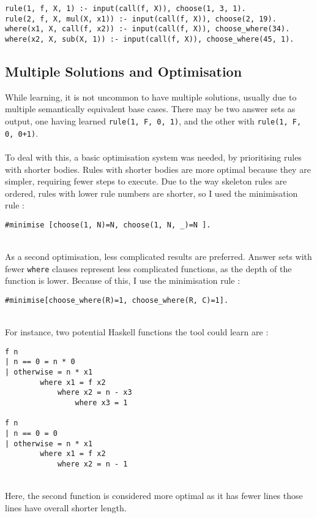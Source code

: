 \begin{lstlisting}
rule(1, f, X, 1) :- input(call(f, X)), choose(1, 3, 1).
rule(2, f, X, mul(X, x1)) :- input(call(f, X)), choose(2, 19).
where(x1, X, call(f, x2)) :- input(call(f, X)), choose_where(34).
where(x2, X, sub(X, 1)) :- input(call(f, X)), choose_where(45, 1).
\end{lstlisting}

\subsection{Multiple Solutions and Optimisation}
While learning, it is not uncommon to have multiple solutions, usually due to multiple semantically equivalent base cases. There may be two answer sets as output, one having learned \lstinline{rule(1, F, 0, 1)}, and the other with \lstinline{rule(1, F, 0, 0+1)}. \\ \\
To deal with this, a basic optimisation system was needed, by prioritising rules with shorter bodies. Rules with shorter bodies are more optimal because they are simpler, requiring fewer steps to execute. Due to the way skeleton rules are ordered, rules with lower rule numbers are shorter, so I used the minimisation rule :

\begin{lstlisting}
#minimise [choose(1, N)=N, choose(1, N, _)=N ].
\end{lstlisting}
\mbox{}\\
As a second optimisation, less complicated results are preferred. Answer sets with fewer \lstinline{where} clauses represent less complicated functions, as the depth of the function is lower. Because of this, I use the minimisation rule : \\ %

\begin{lstlisting}
#minimise[choose_where(R)=1, choose_where(R, C)=1].
\end{lstlisting}
\mbox{}\\
For instance, two potential Haskell functions the tool could learn are : \\

\begin{lstlisting}
f n
| n == 0 = n * 0
| otherwise = n * x1
		where x1 = f x2
			where x2 = n - x3
				where x3 = 1 
				
f n
| n == 0 = 0
| otherwise = n * x1
		where x1 = f x2
			where x2 = n - 1
\end{lstlisting}
\mbox{}\\
Here, the second function is considered more optimal as it has fewer lines those lines have overall shorter length.

